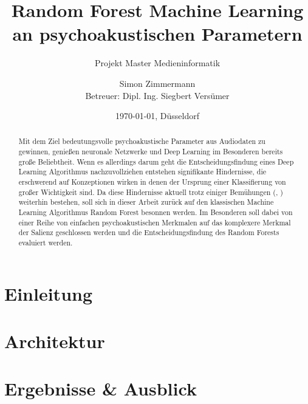 \documentclass{scrartcl}
\title{Random Forest Machine Learning an psychoakustischen Parametern}
\subtitle{Projekt Master Medieninformatik}
\author{Simon Zimmermann \\ Betreuer: Dipl. Ing. Siegbert Versümer}
\date{\today{}, Düsseldorf}
\begin{document}
	{\let\newpage\relax\maketitle}
	\begin{abstract}{}
		Mit dem Ziel bedeutungsvolle psychoakustische Parameter aus Audiodaten zu gewinnen, genießen neuronale Netzwerke und Deep Learning im Besonderen bereits große Beliebtheit.
		Wenn es allerdings darum geht die Entscheidungsfindung eines Deep Learning Algorithmus nachzuvollziehen entstehen signifikante Hindernisse, die erschwerend auf Konzeptionen wirken in denen der Ursprung einer Klassifierung von großer Wichtigkeit sind. Da diese Hindernisse aktuell trotz einiger Bemühungen (\cite{Oh2017}, \cite{Shwartz-Ziv2017}) weiterhin bestehen, soll sich in dieser Arbeit zurück auf den klassischen Machine Learning Algorithmus Random Forest besonnen werden.
		Im Besonderen soll dabei von einer Reihe von einfachen psychoakustischen Merkmalen auf das komplexere Merkmal der Salienz geschlossen werden und die Entscheidungsfindung des Random Forests evaluiert werden.
	\end{abstract}

	\begin{multicols}{2}
		\section{Einleitung}
		\section{Architektur}
		\section{Ergebnisse \& Ausblick}
	\end{multicols}

	
\end{document}
